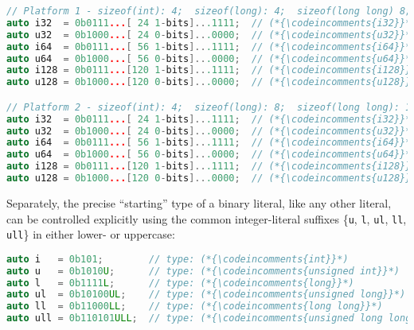 \documentclass[twoside,10pt,letterpaper,usenames]{newstyle-PearsonGeneric-7-38}
\newcommand{\codeincomments}{\color{skyblue}\ttfamily}
\begin{document}
\begin{lstlisting}[language=C++]
// Platform 1 - sizeof(int): 4;  sizeof(long): 4;  sizeof(long long) 8;
auto i32  = 0b0111...[ 24 1-bits]...1111;  // (*{\codeincomments{i32}}*)  is (*{\codeincomments{int}}*)
auto u32  = 0b1000...[ 24 0-bits]...0000;  // (*{\codeincomments{u32}}*)  is (*{\codeincomments{unsigned int}}*)
auto i64  = 0b0111...[ 56 1-bits]...1111;  // (*{\codeincomments{i64}}*)  is (*{\codeincomments{long long}}*)
auto u64  = 0b1000...[ 56 0-bits]...0000;  // (*{\codeincomments{u64}}*)  is (*{\codeincomments{unsigned long long}}*)
auto i128 = 0b0111...[120 1-bits]...1111;  // (*{\codeincomments{i128}}*) is ill-formed/DR
auto u128 = 0b1000...[120 0-bits]...0000;  // (*{\codeincomments{u128}}*) is ill-formed/DR

// Platform 2 - sizeof(int): 4;  sizeof(long): 8;  sizeof(long long): 16;
auto i32  = 0b0111...[ 24 1-bits]...1111;  // (*{\codeincomments{i32}}*)  is (*{\codeincomments{int}}*)
auto u32  = 0b1000...[ 24 0-bits]...0000;  // (*{\codeincomments{u32}}*)  is (*{\codeincomments{unsigned int}}*)
auto i64  = 0b0111...[ 56 1-bits]...1111;  // (*{\codeincomments{i64}}*)  is (*{\codeincomments{long}}*)
auto u64  = 0b1000...[ 56 0-bits]...0000;  // (*{\codeincomments{u64}}*)  is (*{\codeincomments{unsigned long}}*)
auto i128 = 0b0111...[120 1-bits]...1111;  // (*{\codeincomments{i128}}*) is (*{\codeincomments{long long}}*)
auto u128 = 0b1000...[120 0-bits]...0000;  // (*{\codeincomments{u128}}*) is (*{\codeincomments{unsigned long long}}*)
\end{lstlisting}
    

Separately, the precise ``starting'' type of a binary literal, like any
other literal, can be controlled explicitly using the common
integer-literal suffixes \{\texttt{u}, \texttt{l}, \texttt{ul},
\texttt{ll}, \texttt{ull}\} in either lower- or uppercase:

\begin{lstlisting}[language=C++]
auto i   = 0b101;        // type: (*{\codeincomments{int}}*)                  value: 5
auto u   = 0b1010U;      // type: (*{\codeincomments{unsigned int}}*)         value: 10
auto l   = 0b1111L;      // type: (*{\codeincomments{long}}*)                 value: 15
auto ul  = 0b10100UL;    // type: (*{\codeincomments{unsigned long}}*)        value: 20
auto ll  = 0b11000LL;    // type: (*{\codeincomments{long long}}*)            value: 25
auto ull = 0b110101ULL;  // type: (*{\codeincomments{unsigned long long}}*)   value: 30
\end{lstlisting}
    
\end{document}
